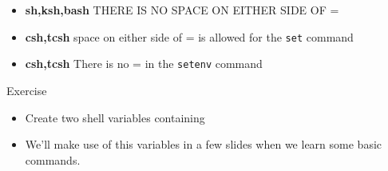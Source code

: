 \documentclass[slidestop,mathserif,compress,xcolor=svgnames]{beamer}
\newenvironment{eblock}[0]
{
\begin{beamerboxesrounded}[upper=uppercol2,lower=lowercol2,shadow=true]}
{\end{beamerboxesrounded}}
\begin{document}
\begin{frame}
\begin{itemize}
\begin{center}
    \end{center}
    \item \textbf{sh,ksh,bash} THERE IS NO SPACE ON EITHER SIDE OF =
    \item \textbf{csh,tcsh} space on either side of = is allowed for the \texttt{set} command
    \item \textbf{csh,tcsh} There is no = in the \texttt{setenv} command
  \end{itemize}
  \framebreak
  \begin{eblock}{Exercise}
    \begin{itemize}
      \item Create two shell variables containing
      \item We'll make use of this variables in a few slides when we learn some basic commands.
    \end{itemize}
  \end{eblock}
\end{frame}
\end{document}
